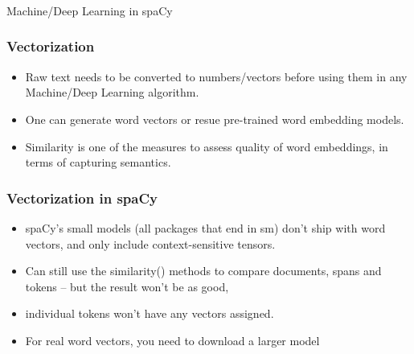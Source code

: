 \begin{frame}[fragile]\frametitle{}

\begin{center}
{\Large Machine/Deep Learning in spaCy}
\end{center}
\end{frame}

\begin{frame}[fragile]\frametitle{Vectorization}

\begin{itemize}
\item Raw  text needs to be converted to numbers/vectors before using them in any Machine/Deep Learning algorithm.
\item One can generate word vectors or resue pre-trained word embedding models.
\item Similarity is one of the measures to assess quality of word embeddings, in terms of capturing semantics.
\end{itemize}
\end{frame}


\begin{frame}[fragile]\frametitle{Vectorization in spaCy}

\begin{itemize}
\item spaCy’s small models (all packages that end in sm) don’t ship with word vectors, and only include context-sensitive tensors. 
\item Can still use the similarity() methods to compare documents, spans and tokens – but the result won’t be as good, 
\item individual tokens won’t have any vectors assigned. 
\item For real word vectors, you need to download a larger model
\end{itemize}
\end{frame}


